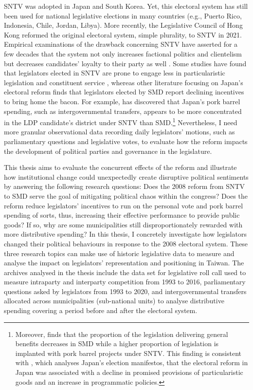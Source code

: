 SNTV was adopted in Japan and South Korea. Yet, this electoral system has still been used for national legislative elections in many countries (e.g., Puerto Rico, Indonesia, Chile, Jordan, Libya). More recently, the Legislative Council of Hong Kong reformed the original electoral system, simple plurality, to SNTV in 2021. Empirical examinations of the drawback concerning SNTV have asserted for a few decades that the system not only increases factional politics and clientelism \citep[e.g.][]{Chang2007, Wu2003} but decreases candidates' loyalty to their party as well \citep[][]{Reed2003, Herron2018, Hsu2004, Nathan1993}. Some studies have found that legislators elected in SNTV are prone to engage less in particularistic legislation \citep[e.g.,][]{Lancaster1986, Crisp2004b, Kerevel2015, Rogowski2017} and constituent service \citep[e.g.,][]{Heitshusen2005}, whereas other literature focusing on Japan's electoral reform finds that legislators elected by SMD report declining incentives to bring home the bacon. For example, \citet{Hirano2006} has discovered that Japan's pork barrel spending, such as intergovernmental transfers, appears to be more concentrated in the LDP candidate's district under SNTV than SMD.\footnote{Moreover, \citet[][]{Sheng2014} finds that the proportion of the legislation delivering general benefits decreases in SMD while a higher proportion of legislation is implanted with pork barrel projects under SNTV. This finding is consistent with \citet{Catalinac2016}, which analyses Japan's election manifestos, that the electoral reform in Japan was associated with a decline in promised provisions of particularistic goods and an increase in programmatic policies.} Nevertheless, I need more granular observational data recording daily legislators' motions, such as parliamentary questions and legislative votes, to evaluate how the reform impacts the development of political parties and governance in the legislature. 

This thesis aims to evaluate the concurrent effects of the reform and illustrate how institutional change could unexpectedly create disruptive political sentiments by answering the following research questions: Does the 2008 reform from SNTV to SMD serve the goal of mitigating political chaos within the congress? Does the reform reduce legislators' incentives to run on the personal vote and pork barrel spending of sorts, thus, increasing their effective performance to provide public goods? If so, why are some municipalities still disproportionately rewarded with more distributive spending? In this thesis, I concretely investigate how legislators changed their political behaviours in response to the 2008 electoral system. These three research topics can make use of historic legislative data to measure and analyse the impact on legislators' representation and positioning in Taiwan. The archives analysed in the thesis include the data set for legislative roll call used to measure intraparty and interparty competition from 1993 to 2016, parliamentary questions asked by legislators from 1993 to 2020, and intergovernmental transfers allocated across municipalities (sub-national units) to analyse distributive spending covering a period before and after the electoral system.

